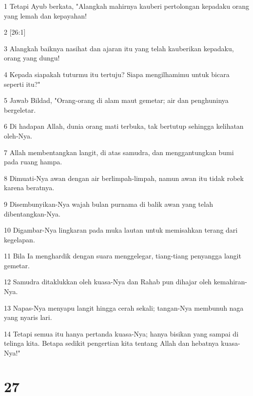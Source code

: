 \par 1 Tetapi Ayub berkata, "Alangkah mahirnya kauberi pertolongan kepadaku orang yang lemah dan kepayahan!
\par 2 [26:1]
\par 3 Alangkah baiknya nasihat dan ajaran itu yang telah kauberikan kepadaku, orang yang dungu!
\par 4 Kepada siapakah tuturmu itu tertuju? Siapa mengilhamimu untuk bicara seperti itu?"
\par 5 Jawab Bildad, "Orang-orang di alam maut gemetar; air dan penghuninya bergeletar.
\par 6 Di hadapan Allah, dunia orang mati terbuka, tak bertutup sehingga kelihatan oleh-Nya.
\par 7 Allah membentangkan langit, di atas samudra, dan menggantungkan bumi pada ruang hampa.
\par 8 Dimuati-Nya awan dengan air berlimpah-limpah, namun awan itu tidak robek karena beratnya.
\par 9 Disembunyikan-Nya wajah bulan purnama di balik awan yang telah dibentangkan-Nya.
\par 10 Digambar-Nya lingkaran pada muka lautan untuk memisahkan terang dari kegelapan.
\par 11 Bila Ia menghardik dengan suara menggelegar, tiang-tiang penyangga langit gemetar.
\par 12 Samudra ditaklukkan oleh kuasa-Nya dan Rahab pun dihajar oleh kemahiran-Nya.
\par 13 Napas-Nya menyapu langit hingga cerah sekali; tangan-Nya membunuh naga yang nyaris lari.
\par 14 Tetapi semua itu hanya pertanda kuasa-Nya; hanya bisikan yang sampai di telinga kita. Betapa sedikit pengertian kita tentang Allah dan hebatnya kuasa-Nya!"

\chapter{27}

